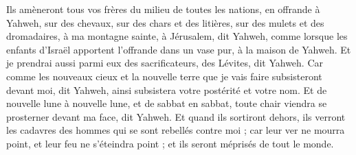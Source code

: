 \begin{multicols}{2}
Ils amèneront tous vos frères du milieu de toutes les nations, en offrande à Yahweh, sur des chevaux, sur des chars et des litières, sur des mulets et des dromadaires, à ma montagne sainte, à Jérusalem, dit Yahweh, comme lorsque les enfants d'Israël apportent l'offrande dans un vase pur, à la maison de Yahweh.
Et je prendrai aussi parmi eux des sacrificateurs, des Lévites, dit Yahweh.
Car comme les nouveaux cieux et la nouvelle terre que je vais faire subsisteront devant moi, dit Yahweh, ainsi subsistera votre postérité et votre nom.
Et de nouvelle lune à nouvelle lune, et de sabbat en sabbat, toute chair viendra se prosterner devant ma face, dit Yahweh.
Et quand ils sortiront dehors, ils verront les cadavres des hommes qui se sont rebellés contre moi ; car leur ver ne mourra point, et leur feu ne s'éteindra point ; et ils seront méprisés de tout le monde.
\PPE{}
\end{multicols}
